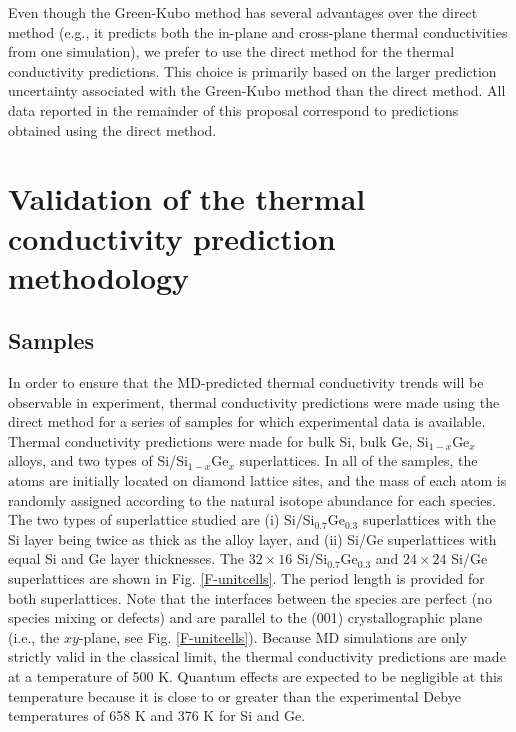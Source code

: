 \documentclass[letterpaper,12pt]{article}
\begin{document}
Even though the Green-Kubo method has several advantages over the
direct method (e.g., it predicts both the in-plane and cross-plane
thermal conductivities from one simulation), we prefer to use the
direct method for the thermal conductivity predictions. This choice
is primarily based on the larger prediction uncertainty associated
with the Green-Kubo method than the direct method. All data reported
in the remainder of this proposal correspond to predictions obtained
using the direct method.

\clearpage

\section{\label{S-validation}Validation of the thermal conductivity prediction methodology}

\subsection{\label{S-validation-samples}Samples}

In order to ensure that the MD-predicted thermal conductivity trends
will be observable in experiment, thermal conductivity predictions
were made using the direct method for a series of samples for which
experimental data is available.\cite{landry2008b} Thermal
conductivity predictions were made for bulk Si, bulk Ge,
Si$_{1-x}$Ge$_x$ alloys, and two types of Si/Si$_{1-x}$Ge$_x$
superlattices. In all of the samples, the atoms are initially
located on diamond lattice sites, and the mass of each atom is
randomly assigned according to the natural isotope abundance for
each species.\cite{CRChandbook} The two types of superlattice
studied are (i) Si/Si$_{0.7}$Ge$_{0.3}$ superlattices with the Si
layer being twice as thick as the alloy layer, and (ii) Si/Ge
superlattices with equal Si and Ge layer thicknesses. The
$32\times16$ Si/Si$_{0.7}$Ge$_{0.3}$ and $24\times24$ Si/Ge
superlattices are shown in Fig$.$ \ref{F-unitcells}. The period
length is provided for both superlattices. Note that the interfaces
between the species are perfect (no species mixing or defects) and
are parallel to the (001) crystallographic plane (i.e., the
$xy$-plane, see Fig. \ref{F-unitcells}). Because MD simulations are
only strictly valid in the classical limit, the thermal conductivity
predictions are made at a temperature of 500 K. Quantum effects are
expected to be negligible at this temperature because it is close to
or greater than the experimental Debye temperatures of 658 K and 376
K for Si and Ge.\cite{capinski1997}
\end{document}
